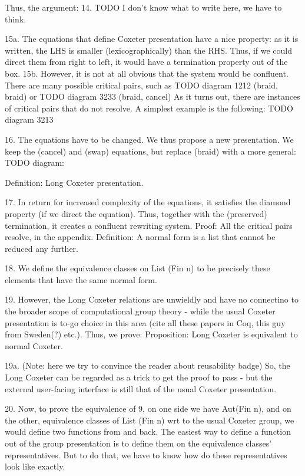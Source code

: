 Thus, the argument:
14. TODO I don't know what to write here, we have to think.

15a. The equations that define Coxeter presentation have a nice property:
as it is written, the LHS is smaller (lexicographically) than the RHS.
Thus, if we could direct them from right to left, it would have a
termination property out of the box.
15b. However, it is not at all obvious that the system would be confluent.
There are many possible critical pairs, such as
TODO diagram 1212 (braid, braid)
or
TODO diagram 3233 (braid, cancel)
As it turns out, there are instances of critical pairs that do not resolve.
A simplest example is the following:
TODO diagram 3213

16. The equations have to be changed. We thus propose a new presentation.
We keep the (cancel) and (swap) equations, but replace (braid) with a more
general:
TODO diagram:

Definition: Long Coxeter presentation.

17. In return for increased complexity of the equations, it satisfies the
diamond property (if we direct the equation). Thus, together with the
(preserved) termination, it creates a confluent rewriting system.
Proof: All the critical pairs resolve, in the appendix.
Definition: A normal form is a list that cannot be reduced any further.

18. We define the equivalence classes on List (Fin n) to be precisely these
elements that have the same normal form.

19. However, the Long Coxeter relations are unwieldly and have no
connectino to the broader scope of computational group theory - while the
usual Coxeter presentation is to-go choice in this area (cite all these
papers in Coq, this guy from Sweden(?) etc.).
Thus, we prove:
Proposition: Long Coxeter is equivalent to normal Coxeter.

19a. (Note: here we try to convince the reader about reusability badge) So,
the Long Coxeter can be regarded as a trick to get the proof to pass - but
the external user-facing interface is still that of the usual Coxeter
presentation.

20. Now, to prove the equivalence of 9, on one side we have Aut(Fin n), and
on the other, equivalence classes of List (Fin n) wrt to the usual Coxeter
group, we would define two functions from and back. The easiest way to
define a function out of the group presentation is to define them on the
equivalence classes' representatives. But to do that, we have to know how
do these representatives look like exactly.

